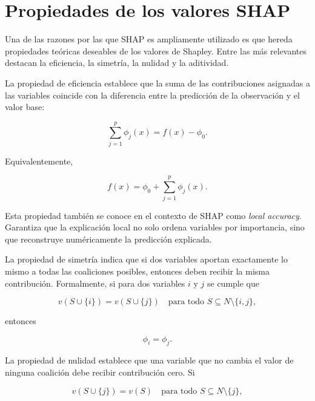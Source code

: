 \section{Propiedades de los valores SHAP}

Una de las razones por las que SHAP es ampliamente utilizado es que hereda propiedades teóricas deseables de los valores de Shapley. Entre las más relevantes destacan la eficiencia, la simetría, la nulidad y la aditividad.

La propiedad de eficiencia establece que la suma de las contribuciones asignadas a las variables coincide con la diferencia entre la predicción de la observación y el valor base:

\begin{equation}
\sum_{j=1}^{p} \phi_j(x)
=
f(x) - \phi_0.
\label{eq:shap-efficiency}
\end{equation}

Equivalentemente,

\begin{equation}
f(x)
=
\phi_0 + \sum_{j=1}^{p} \phi_j(x).
\label{eq:shap-local-accuracy}
\end{equation}

Esta propiedad también se conoce en el contexto de SHAP como \emph{local accuracy}. Garantiza que la explicación local no solo ordena variables por importancia, sino que reconstruye numéricamente la predicción explicada.

La propiedad de simetría indica que si dos variables aportan exactamente lo mismo a todas las coaliciones posibles, entonces deben recibir la misma contribución. Formalmente, si para dos variables \(i\) y \(j\) se cumple que

\begin{equation}
v(S \cup \{i\}) = v(S \cup \{j\})
\quad
\text{para todo }
S \subseteq N \setminus \{i,j\},
\label{eq:shap-symmetry}
\end{equation}

entonces

\begin{equation}
\phi_i = \phi_j.
\end{equation}

La propiedad de nulidad establece que una variable que no cambia el valor de ninguna coalición debe recibir contribución cero. Si

\begin{equation}
v(S \cup \{j\}) = v(S)
\quad
\text{para todo }
S \subseteq N \setminus \{j\},
\label{eq:shap-null-player}
\end{equation}

